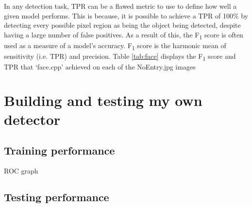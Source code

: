\documentclass[onecolumn, 10pt, a4paper]{article}
\begin{document}
In any detection task, TPR can be a flawed metric to use to define how well a given model performs.
This is because, it is possible to achieve a TPR of 100\% by detecting every possible pixel region as being the object being detected, despite having a large number of false positives.
As a result of this, the F\textsubscript{1} score is often used as a measure of a model's accuracy.
F\textsubscript{1} score is the harmonic mean of sensitivity (i.e. TPR) and precision.
Table \ref{tab:face} displays the F\textsubscript{1} score and TPR that `face.cpp' achieved on each of the NoEntry\textasteriskcentered.jpg images

\clearpage

\section{Building and testing my own detector}

\subsection{Training performance}

ROC graph

\subsection{Testing performance}
\end{document}
